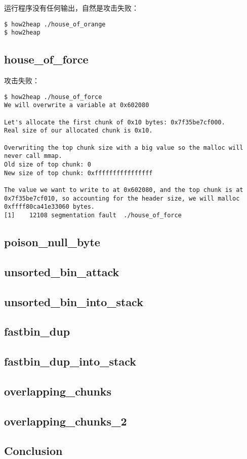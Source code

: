 运行程序没有任何输出，自然是攻击失败：
\begin{verbatim}
$ how2heap ./house_of_orange
$ how2heap 

\end{verbatim}

\subsection{house\_of\_force}

攻击失败：

\begin{verbatim}
$ how2heap ./house_of_force 
We will overwrite a variable at 0x602080

Let's allocate the first chunk of 0x10 bytes: 0x7f35be7cf000.
Real size of our allocated chunk is 0x10.

Overwriting the top chunk size with a big value so the malloc will never call mmap.
Old size of top chunk: 0
New size of top chunk: 0xffffffffffffffff

The value we want to write to at 0x602080, and the top chunk is at 0x7f35be7cf010, so accounting for the header size, we will malloc 0xffff80ca41e33060 bytes.
[1]    12108 segmentation fault  ./house_of_force

\end{verbatim}

\subsection{poison\_null\_byte}

\subsection{unsorted\_bin\_attack}

\subsection{unsorted\_bin\_into\_stack}

\subsection{fastbin\_dup}

\subsection{fastbin\_dup\_into\_stack}

\subsection{overlapping\_chunks}

\subsection{overlapping\_chunks\_2}

\subsection{Conclusion}

\newpage